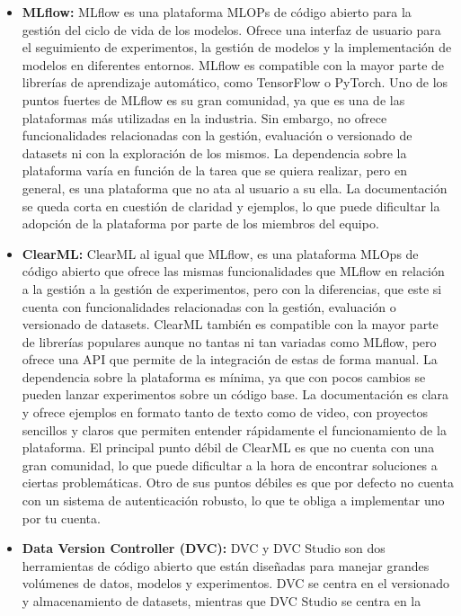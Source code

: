 \begin{itemize}
    \item \textbf{MLflow:} MLflow es una plataforma MLOPs de código abierto para la gestión del ciclo de vida de
    los modelos. Ofrece una interfaz de usuario para el seguimiento de experimentos, la gestión de modelos 
    y la implementación de modelos en diferentes entornos. MLflow es compatible con la mayor parte de librerías de aprendizaje 
    automático, como TensorFlow o PyTorch. Uno de los puntos fuertes de MLflow es su gran comunidad, ya que es
    una de las plataformas más utilizadas en la industria. Sin embargo, no ofrece funcionalidades relacionadas con
    la gestión, evaluación o versionado de datasets ni con la exploración de los mismos. La dependencia sobre la
    plataforma varía en función de la tarea que se quiera realizar, pero en general, es una plataforma que no
    ata al usuario a su ella. La documentación se queda corta en cuestión de claridad y ejemplos, lo que puede
    dificultar la adopción de la plataforma por parte de los miembros del equipo.
    \item \textbf{ClearML:} ClearML al igual que MLflow, es una plataforma MLOps de código abierto que ofrece
    las mismas funcionalidades que MLflow en relación a la gestión a la gestión de experimentos, pero con la
    diferencias, que este si cuenta con funcionalidades relacionadas con la gestión, evaluación o versionado de
    datasets. ClearML también es compatible con la mayor parte de librerías populares aunque no tantas ni tan
    variadas como MLflow, pero ofrece una API que permite de la integración de estas de forma manual. La
    dependencia sobre la plataforma es mínima, ya que con pocos cambios se pueden lanzar experimentos sobre
    un código base. La documentación es clara y ofrece ejemplos en formato tanto de texto como de video, con
    proyectos sencillos y claros que permiten entender rápidamente el funcionamiento de la plataforma. El 
    principal punto débil de ClearML es que no cuenta con una gran comunidad, lo que puede dificultar a
    la hora de encontrar soluciones a ciertas problemáticas. Otro de sus puntos débiles es que por defecto
    no cuenta con un sistema de autenticación robusto, lo que te obliga a implementar uno por tu cuenta.
    \item \textbf{Data Version Controller (DVC):} DVC y DVC Studio son dos herramientas de código abierto que
    están diseñadas para manejar grandes volúmenes de datos, modelos y experimentos. DVC
    se centra en el versionado y almacenamiento de datasets, mientras que DVC Studio se centra en la

\end{itemize}
